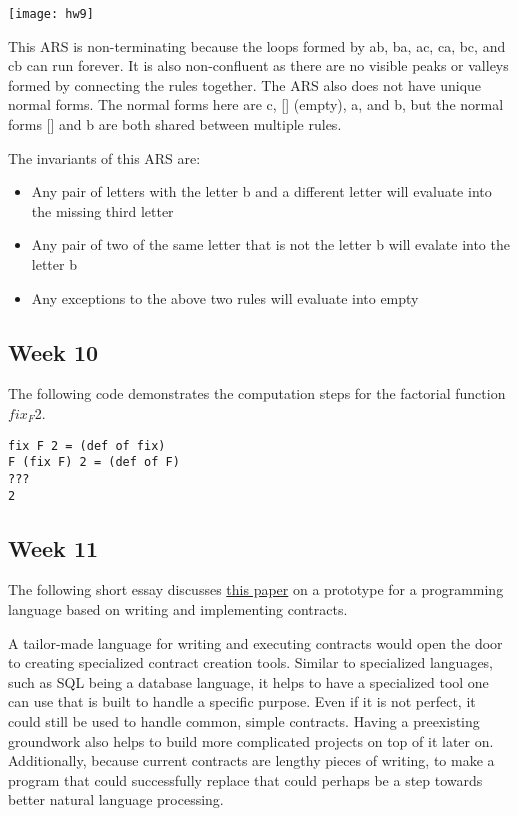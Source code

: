 \documentclass{article}
\theoremstyle{theorem}
\theoremstyle{definition}
\theoremstyle{remark}
\begin{document}
\begin{center}
\texttt{[image: hw9]}
\end{center}
%
This ARS is non-terminating because the loops formed by ab, ba, ac, ca, bc, and cb can run forever. It is also non-confluent as there are no visible peaks or valleys formed by connecting the rules together. The ARS also does not have unique normal forms. The normal forms here are c, [] (empty), a, and b, but the normal forms [] and b are both shared between multiple rules.

\medskip\noindent
The invariants of this ARS are:

\begin{itemize}
\item {Any pair of letters with the letter b and a different letter will evaluate into the missing third letter}
\item {Any pair of two of the same letter that is not the letter b will evalate into the letter b}
\item {Any exceptions to the above two rules will evaluate into empty}
\end{itemize}

\subsection{Week 10}
The following code demonstrates the computation steps for the factorial function $fix_F$2.
\begin{lstlisting}
fix F 2 = (def of fix)
F (fix F) 2 = (def of F)
???
2
\end{lstlisting}

\subsection{Week 11}
The following short essay discusses \href{https://www.cs.tufts.edu/~nr/cs257/archive/simon-peyton-jones/contracts.pdf}{this paper} on a prototype for a programming language based on writing and implementing contracts.

\medskip\noindent
A tailor-made language for writing and executing contracts would open the door to creating specialized contract creation tools. Similar to specialized languages, such as SQL being a database language, it helps to have a specialized tool one can use that is built to handle a specific purpose. Even if it is not perfect, it could still be used to handle common, simple contracts. Having a preexisting groundwork also helps to build more complicated projects on top of it later on. Additionally, because current contracts are lengthy pieces of writing, to make a program that could successfully replace that could perhaps be a step towards better natural language processing.
\end{document}

